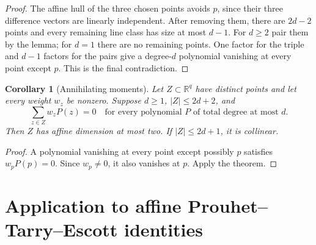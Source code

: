 \documentclass[11pt]{article}
\newtheorem{corollary}[theorem]{Corollary}
\begin{document}
\begin{proof}
The affine hull of the three chosen points avoids $p$, since their
three difference vectors are linearly independent. After removing
them, there are $2d-2$ points and every remaining line class has size
at most $d-1$. For $d\ge2$ pair them by the lemma; for $d=1$ there
are no remaining points. One factor for the triple and $d-1$ factors
for the pairs give a degree-$d$ polynomial vanishing at every point
except $p$. This is the final contradiction.
\end{proof}

\begin{corollary}[Annihilating moments]
Let $Z\subset\mathbb R^q$ have distinct points and let every weight
$w_z$ be nonzero. Suppose $d\ge1$, $|Z|\le2d+2$, and
\[
 \sum_{z\in Z}w_z P(z)=0
 \quad\text{for every polynomial $P$ of total degree at most $d$}.
\]
Then $Z$ has affine dimension at most two. If $|Z|\le2d+1$, it
is collinear.
\end{corollary}
\begin{proof}
A polynomial vanishing at every point except possibly $p$ satisfies
$w_pP(p)=0$. Since $w_p\ne0$, it also vanishes at $p$. Apply the
theorem.
\end{proof}

\section{Application to affine Prouhet--Tarry--Escott identities}
\end{document}
